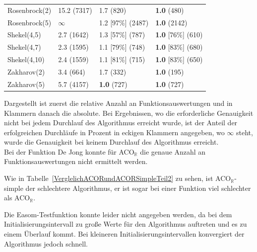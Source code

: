 \documentclass[fontsize=12, a4aper]{scrartcl}
\begin{document}
\begin{table}[H]
\begin{tabularx}{\textwidth}{l|l|l|l}
			Rosenbrock(2) & 15.2 (7317) & 1.7 (820) & \textbf{1.0} (480)\\
			
			Rosenbrock(5) & \(\infty\) & 1.2 [97\%] (2487) & \textbf{1.0} (2142)\\
			
			Shekel(4,5) & 2.7 (1642) & 1.3 [57\%] (787) & \textbf{1.0} [76\%] (610)\\
			
			Shekel(4,7) & 2.3 (1595) & 1.1 [79\%] (748) & \textbf{1.0} [83\%] (680)\\
			
			Shekel(4,10) & 2.4 (1559) & 1.1 [81\%] (715) & \textbf{1.0} [83\%] (650)\\
			
			Zakharov(2) & 3.4 (664) & 1.7 (332) & \textbf{1.0} (195)\\
			
			Zakharov(5) & 5.7 (4157) & \textbf{1.0} (727) & \textbf{1.0} (727)\\
			
		\end{tabularx}
		
		\smallskip
		
		Dargestellt ist zuerst die relative Anzahl an Funktionsauswertungen und in Klammern danach die absolute. Bei Ergebnissen, wo die erforderliche Genauigkeit nicht bei jedem Durchlauf des Algorithmus erreicht wurde, ist der Anteil der erfolgreichen Durchläufe in Prozent in eckigen Klammern angegeben, wo \(\infty\) steht, wurde die Genauigkeit bei keinem Durchlauf des Algorithmus erreicht.\\
		Bei der Funktion \glqq De Jong\grqq \hspace{.16667em} konnte für ACO\(_{\mathbb{R}}\) die genaue Anzahl an Funktionsauswertungen nicht ermittelt werden.\hfill\newline
		
	\end{table}

	\noindent Wie in Tabelle~\ref{VerglelichACORundACORSimpleTeil2} zu sehen, ist ACO\(_{\mathbb{R}}\)-simple der schlechtere Algorithmus, er ist sogar bei einer Funktion viel schlechter als ACO\(_{\mathbb{R}}\).\hfill\newline
	
	Die Easom-Testfunktion konnte leider nicht angegeben werden, da bei dem Initialisierungsintervall zu große Werte für den Algorithmus auftreten und es zu einem Überlauf kommt. Bei kleineren Initialisierungsintervallen konvergiert der Algorithmus jedoch schnell.\hfill\newline
	
\end{document}
